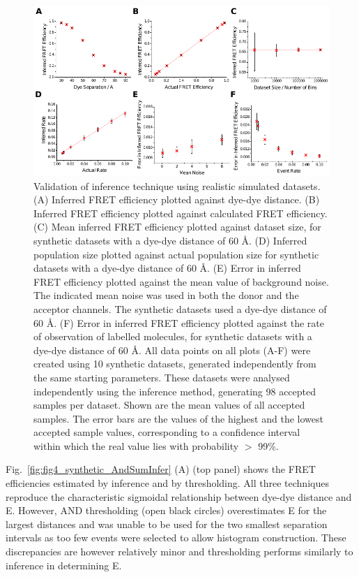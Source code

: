 \begin{figure}
   \begin{center}
      \includegraphics*[width=6in]{inference/fig3_benchmark_synthetic.pdf}
      \caption{Validation of inference technique using realistic simulated datasets.  (A) Inferred FRET efficiency plotted against dye-dye distance.  (B) Inferred FRET efficiency plotted against calculated FRET efficiency. (C) Mean inferred FRET efficiency plotted against dataset size, for synthetic datasets with a dye-dye distance of 60 \AA. (D) Inferred population size plotted against actual population size for synthetic datasets with a dye-dye distance of 60 \AA. (E) Error in inferred FRET efficiency plotted against the mean value of background noise. The indicated mean noise was used in both the donor and the acceptor channels. The synthetic datasets used a dye-dye distance of 60 \AA. (F) Error in inferred FRET efficiency plotted against the rate of observation of labelled molecules, for synthetic datasets with a dye-dye distance of 60 \AA.  All data points on all plots (A-F) were created using 10 synthetic datasets, generated independently from the same starting parameters.  These datasets were analysed independently using the inference method, generating 98 accepted samples per dataset.  Shown are the mean values of all accepted samples.  The error bars are the values of the highest and the lowest accepted sample values, corresponding to a confidence interval within which the real value lies with probability $>$ 99\%.}
      \label{fig:fig3_benchmark_synthetic}
   \end{center}
\end{figure}

Fig.~\ref{fig:fig4_synthetic_AndSumInfer} (A) (top panel) shows the FRET efficiencies estimated by inference and by thresholding.  All three techniques reproduce the characteristic sigmoidal relationship between dye-dye distance and E.  However, AND thresholding (open black circles) overestimates E for the largest distances and was unable to be used for the two smallest separation intervals as too few events were selected to allow histogram construction. These discrepancies are however relatively minor and thresholding performs similarly to inference in determining E.   

